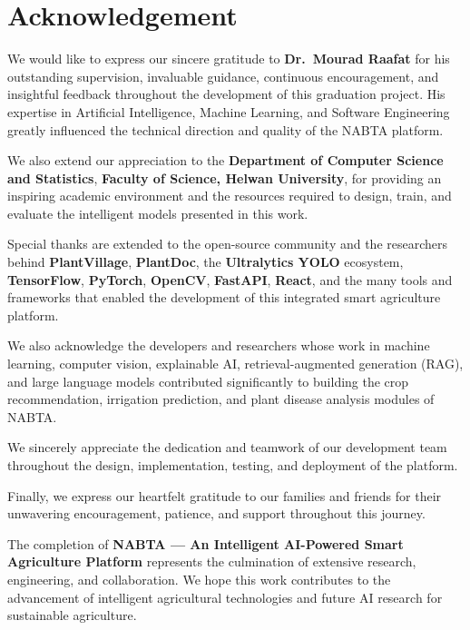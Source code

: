 
\chapter*{Acknowledgement}

We would like to express our sincere gratitude to \textbf{Dr.\ Mourad Raafat} for his outstanding supervision, invaluable guidance, continuous encouragement, and insightful feedback throughout the development of this graduation project. His expertise in Artificial Intelligence, Machine Learning, and Software Engineering greatly influenced the technical direction and quality of the NABTA platform.

We also extend our appreciation to the \textbf{Department of Computer Science and Statistics}, \textbf{Faculty of Science, Helwan University}, for providing an inspiring academic environment and the resources required to design, train, and evaluate the intelligent models presented in this work.

Special thanks are extended to the open-source community and the researchers behind \textbf{PlantVillage}, \textbf{PlantDoc}, the \textbf{Ultralytics YOLO} ecosystem, \textbf{TensorFlow}, \textbf{PyTorch}, \textbf{OpenCV}, \textbf{FastAPI}, \textbf{React}, and the many tools and frameworks that enabled the development of this integrated smart agriculture platform.

We also acknowledge the developers and researchers whose work in machine learning, computer vision, explainable AI, retrieval-augmented generation (RAG), and large language models contributed significantly to building the crop recommendation, irrigation prediction, and plant disease analysis modules of NABTA.

We sincerely appreciate the dedication and teamwork of our development team throughout the design, implementation, testing, and deployment of the platform.

Finally, we express our heartfelt gratitude to our families and friends for their unwavering encouragement, patience, and support throughout this journey.

The completion of \textbf{NABTA --- An Intelligent AI-Powered Smart Agriculture Platform} represents the culmination of extensive research, engineering, and collaboration. We hope this work contributes to the advancement of intelligent agricultural technologies and future AI research for sustainable agriculture.
